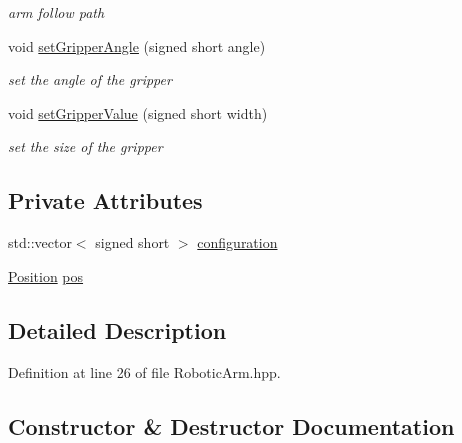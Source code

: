 \begin{DoxyCompactItemize}
\begin{DoxyCompactList}\small\item\em arm follow path \end{DoxyCompactList}\item 
void \hyperlink{class_robotic_arm_a24928c88b03f5d2e55ac980c019dadd8}{set\+Gripper\+Angle} (signed short angle)
\begin{DoxyCompactList}\small\item\em set the angle of the gripper \end{DoxyCompactList}\item 
void \hyperlink{class_robotic_arm_a5b15b0eb40028d3524bae3a52552bd85}{set\+Gripper\+Value} (signed short width)
\begin{DoxyCompactList}\small\item\em set the size of the gripper \end{DoxyCompactList}\end{DoxyCompactItemize}
\subsection*{Private Attributes}
\begin{DoxyCompactItemize}
\item 
std\+::vector$<$ signed short $>$ \hyperlink{class_robotic_arm_af618e34115514462d09020049c7e8ee9}{configuration}
\item 
\hyperlink{struct_position}{Position} \hyperlink{class_robotic_arm_a8f6a5bea331874cfae234e6b97f6dec5}{pos}
\end{DoxyCompactItemize}


\subsection{Detailed Description}


Definition at line 26 of file Robotic\+Arm.\+hpp.



\subsection{Constructor \& Destructor Documentation}
